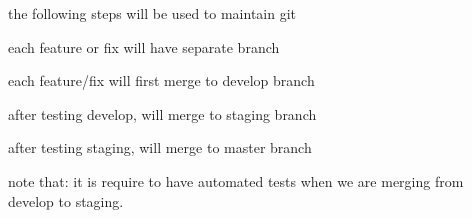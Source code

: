 the following steps will be used to maintain git


\begin{DoxyItemize}
\item each feature or fix will have separate branch ~\newline

\item each feature/fix will first merge to develop branch
\item after testing develop, will merge to staging branch
\item after testing staging, will merge to master branch
\end{DoxyItemize}

note that\+: it is require to have automated tests when we are merging from develop to staging. 